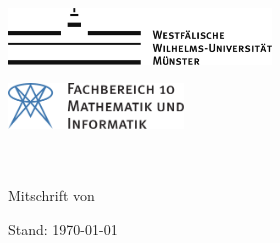 \begin{titlepage}
\pagestyle{empty}
\begin{center}
\begin{minipage}{0.4\textwidth}
\begin{flushleft}
\includegraphics[height=1.5cm,keepaspectratio]{img/wwulogo.pdf}
\end{flushleft}
\end{minipage}
\hfill
\begin{minipage}{0.4\textwidth}
\begin{flushright}
\vspace*{0.3cm}
\includegraphics[height=1.2cm,keepaspectratio]{img/fb10logo.pdf} \
\end{flushright}
\end{minipage}

\vspace*{8cm}
\textbf{\Huge{\dertitel}} \\
\vspace{0.2cm} 
\textbf{{\LARGE \dersubtitel}} \\
\vspace{0.6cm}
\LARGE{Mitschrift von \derautor} \\
\vspace{0.6cm}
\LARGE{\dasdatum}

\vfill

\vspace*{2cm}
\begin{flushright}
{\footnotesize Stand: \today}
\end{flushright}
\end{center}
\end{titlepage}